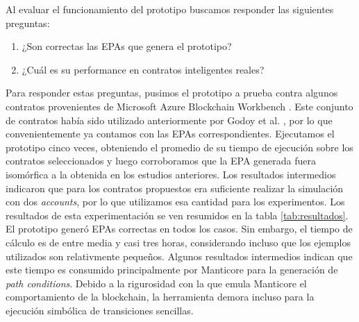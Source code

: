 Al evaluar el funcionamiento del prototipo buscamos responder las siguientes preguntas:
\begin{enumerate}
    \item ¿Son correctas las EPAs que genera el prototipo?
    \item ¿Cuál es su performance en contratos inteligentes reales?
\end{enumerate}
Para responder estas preguntas, pusimos el prototipo a prueba contra algunos contratos provenientes de Microsoft Azure Blockchain Workbench \cite{azure-benchmark}.
Este conjunto de contratos había sido utilizado anteriormente por Godoy et al. \cite{predicate-abstraction-for-smart-contract-validation}, por lo que convenientemente ya contamos con las EPAs correspondientes.
Ejecutamos el prototipo cinco veces, obteniendo el promedio de su tiempo de ejecución sobre los contratos seleccionados y luego corroboramos que la EPA generada fuera isomórfica a la obtenida en los estudios anteriores.
Los resultados intermedios indicaron que para los contratos propuestos era suficiente realizar la simulación con dos \textit{accounts}, por lo que utilizamos esa cantidad para los experimentos.
Los resultados de esta experimentación se ven resumidos en la tabla \ref{tab:resultados}.
El prototipo generó EPAs correctas en todos los casos.
Sin embargo, el tiempo de cálculo es de entre media y casi tres horas, considerando incluso que los ejemplos utilizados son relativmente pequeños.
Algunos resultados intermedios indican que este tiempo es consumido principalmente por Manticore para la generación de \textit{path conditions}.
Debido a la rigurosidad con la que emula Manticore el comportamiento de la blockchain, la herramienta demora incluso para la ejecución simbólica de transiciones sencillas.

\vspace{-2.2em}


